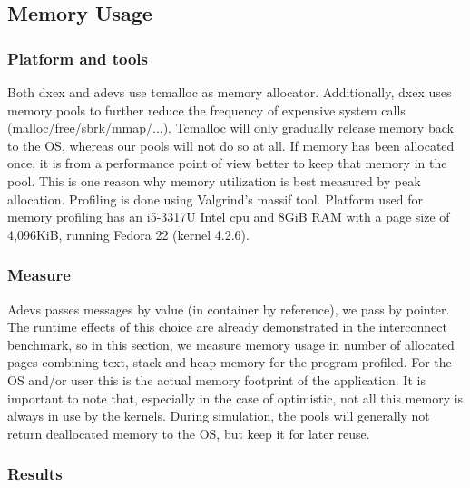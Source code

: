 \subsection{Memory Usage}
\subsubsection{Platform and tools}
Both dxex and adevs use tcmalloc as memory allocator. Additionally, dxex uses memory pools to further reduce the frequency of expensive system calls (malloc/free/sbrk/mmap/...). Tcmalloc will only gradually release memory back to the OS, whereas our pools will not do so at all. If memory has been allocated once, it is from a performance point of view better to keep that memory in the pool. This is one reason why memory utilization is best measured by peak allocation. Profiling is done using Valgrind's massif tool. \cite{Nethercote:2007:VFH:1273442.1250746}
Platform used for memory profiling has an i5-3317U Intel cpu and 8GiB RAM with a page size of 4,096KiB, running Fedora 22 (kernel 4.2.6).\\
\subsubsection{Measure}
Adevs passes messages by value (in container by reference), we pass by pointer. The runtime effects of this choice are already demonstrated in the interconnect benchmark, so in this section, we measure memory usage in number of allocated pages combining text, stack and heap memory for the program profiled. For the OS and/or user this is the actual memory footprint of the application. It is important to note that, especially in the case of optimistic, not all this memory is always in use by the kernels. During simulation, the pools will generally not return deallocated memory to the OS, but keep it for later reuse.
\subsubsection{Results}
